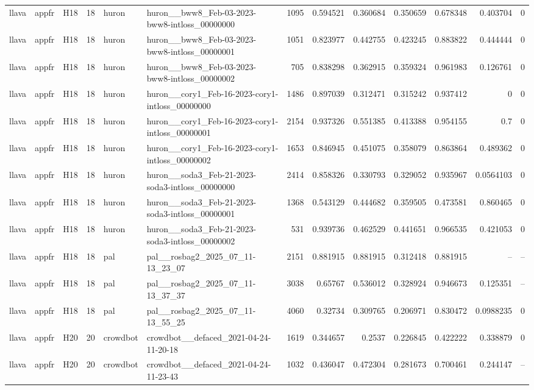 \begin{longtable}{lllrllrrrrrrr}
llava & appfr & H18 & 18 & huron & huron\_\_bww8\_Feb-03-2023-bww8-intloss\_00000000 & 1095 & 0.594521 & 0.360684 & 0.350659 & 0.678348 & 0.403704 & 0 \\
llava & appfr & H18 & 18 & huron & huron\_\_bww8\_Feb-03-2023-bww8-intloss\_00000001 & 1051 & 0.823977 & 0.442755 & 0.423245 & 0.883822 & 0.444444 & 0 \\
llava & appfr & H18 & 18 & huron & huron\_\_bww8\_Feb-03-2023-bww8-intloss\_00000002 & 705 & 0.838298 & 0.362915 & 0.359324 & 0.961983 & 0.126761 & 0 \\
llava & appfr & H18 & 18 & huron & huron\_\_cory1\_Feb-16-2023-cory1-intloss\_00000000 & 1486 & 0.897039 & 0.312471 & 0.315242 & 0.937412 & 0 & 0 \\
llava & appfr & H18 & 18 & huron & huron\_\_cory1\_Feb-16-2023-cory1-intloss\_00000001 & 2154 & 0.937326 & 0.551385 & 0.413388 & 0.954155 & 0.7 & 0 \\
llava & appfr & H18 & 18 & huron & huron\_\_cory1\_Feb-16-2023-cory1-intloss\_00000002 & 1653 & 0.846945 & 0.451075 & 0.358079 & 0.863864 & 0.489362 & 0 \\
llava & appfr & H18 & 18 & huron & huron\_\_soda3\_Feb-21-2023-soda3-intloss\_00000000 & 2414 & 0.858326 & 0.330793 & 0.329052 & 0.935967 & 0.0564103 & 0 \\
llava & appfr & H18 & 18 & huron & huron\_\_soda3\_Feb-21-2023-soda3-intloss\_00000001 & 1368 & 0.543129 & 0.444682 & 0.359505 & 0.473581 & 0.860465 & 0 \\
llava & appfr & H18 & 18 & huron & huron\_\_soda3\_Feb-21-2023-soda3-intloss\_00000002 & 531 & 0.939736 & 0.462529 & 0.441651 & 0.966535 & 0.421053 & 0 \\
llava & appfr & H18 & 18 & pal & pal\_\_rosbag2\_2025\_07\_11-13\_23\_07 & 2151 & 0.881915 & 0.881915 & 0.312418 & 0.881915 & -- & -- \\
llava & appfr & H18 & 18 & pal & pal\_\_rosbag2\_2025\_07\_11-13\_37\_37 & 3038 & 0.65767 & 0.536012 & 0.328924 & 0.946673 & 0.125351 & -- \\
llava & appfr & H18 & 18 & pal & pal\_\_rosbag2\_2025\_07\_11-13\_55\_25 & 4060 & 0.32734 & 0.309765 & 0.206971 & 0.830472 & 0.0988235 & 0 \\
llava & appfr & H20 & 20 & crowdbot & crowdbot\_\_defaced\_2021-04-24-11-20-18 & 1619 & 0.344657 & 0.2537 & 0.226845 & 0.422222 & 0.338879 & 0 \\
llava & appfr & H20 & 20 & crowdbot & crowdbot\_\_defaced\_2021-04-24-11-23-43 & 1032 & 0.436047 & 0.472304 & 0.281673 & 0.700461 & 0.244147 & -- \\

\end{longtable}
